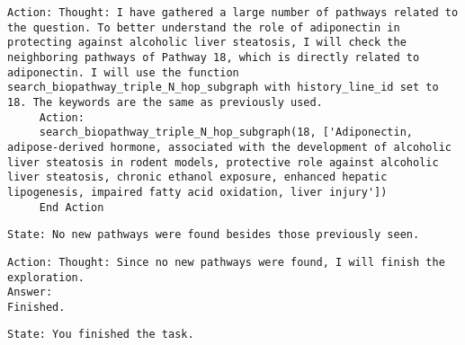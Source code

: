 \begin{lstlisting}[style=AnswerType]
Action: Thought: I have gathered a large number of pathways related to the question. To better understand the role of adiponectin in protecting against alcoholic liver steatosis, I will check the neighboring pathways of Pathway 18, which is directly related to adiponectin. I will use the function search_biopathway_triple_N_hop_subgraph with history_line_id set to 18. The keywords are the same as previously used.
     Action:
     search_biopathway_triple_N_hop_subgraph(18, ['Adiponectin, adipose-derived hormone, associated with the development of alcoholic liver steatosis in rodent models, protective role against alcoholic liver steatosis, chronic ethanol exposure, enhanced hepatic lipogenesis, impaired fatty acid oxidation, liver injury'])
     End Action
\end{lstlisting}
\begin{lstlisting}[style=QuestionType]
State: No new pathways were found besides those previously seen.
\end{lstlisting}
\begin{lstlisting}[style=AnswerType]
Action: Thought: Since no new pathways were found, I will finish the exploration.
Answer:
Finished.
\end{lstlisting}
\begin{lstlisting}[style=QuestionType]
State: You finished the task.
\end{lstlisting}




